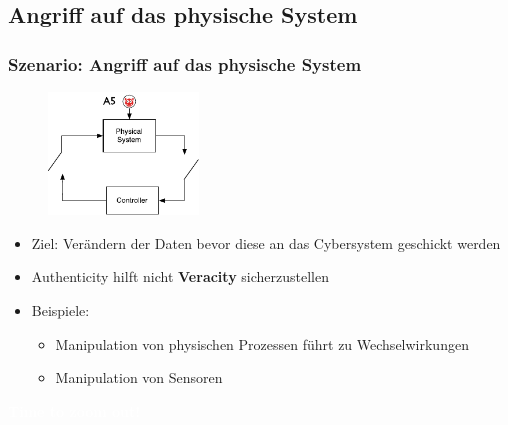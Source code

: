 \documentclass{sikslides}
\begin{document}
    \subsection{Angriff auf das physische System}
    \begin{frame}
        \frametitle{Szenario: Angriff auf das physische System}
        \begin{figure}
            \centering
            \includegraphics[width=4cm]{figure/physical}
        \end{figure}
        \begin{itemize}
            \item Ziel: Verändern der Daten bevor diese an das Cybersystem geschickt werden
            \item Authenticity hilft nicht \textbf{Veracity} sicherzustellen
            \pause
            \item Beispiele:
            \begin{itemize}
                \item Manipulation von physischen Prozessen führt zu Wechselwirkungen
                \item Manipulation von Sensoren
            \end{itemize}
        \end{itemize}
    \end{frame}


    \bgroup
    \begin{frame}[plain]{}
        \centering
        \Huge\textbf{\textcolor{white}{Time to zoom out!}}
    \end{frame}
    \egroup
\end{document}
